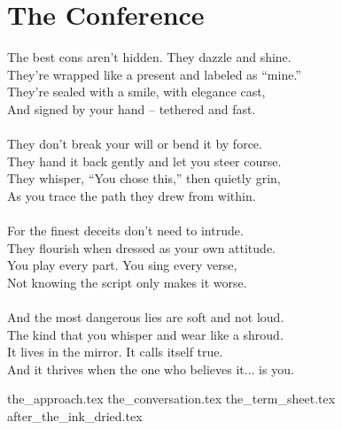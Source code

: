 \part{The Conference}

\vfill

\begin{flushright}
    \Large
    The best cons aren’t hidden. They dazzle and shine. \\
    They're wrapped like a present and labeled as ``mine.'' \\
    They’re sealed with a smile, with elegance cast, \\
    And signed by your hand -- tethered and fast. \\
    \ \\
    They don’t break your will or bend it by force. \\
    They hand it back gently and let you steer course. \\
    They whisper, ``You chose this,'' then quietly grin, \\
    As you trace the path they drew from within. \\
    \ \\
    For the finest deceits don’t need to intrude.\\
    They flourish when dressed as your own attitude. \\
    You play every part. You sing every verse, \\
    Not knowing the script only makes it worse. \\
    \ \\
    And the most dangerous lies are soft and not loud.\\
    The kind that you whisper and wear like a shroud. \\
    It lives in the mirror. It calls itself true. \\
    And it thrives when the one who believes it... is you. \\
\end{flushright}


{the_approach.tex}
{the_conversation.tex}
{the_term_sheet.tex}
{after_the_ink_dried.tex}